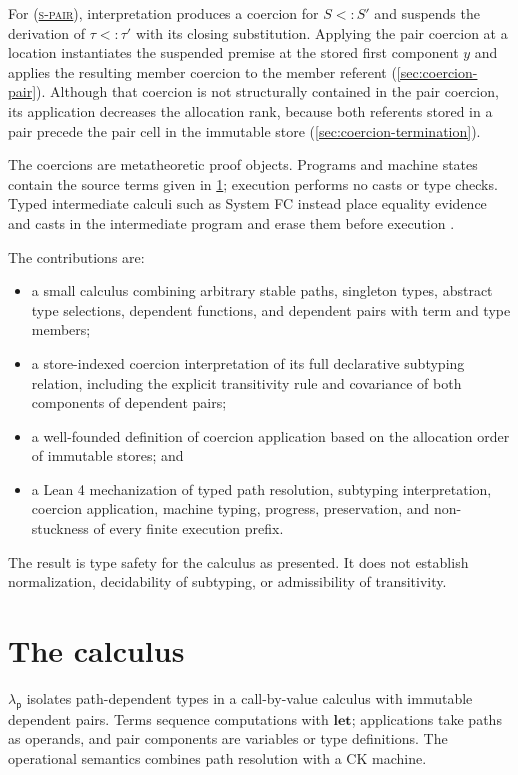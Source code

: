 \documentclass[acmsmall,screen,nonacm]{acmart}
\newcommand{\ruleref}[1]{%
  \textsc{(\hyperref[rule:#1]{#1})}}
\newcommand{\lambdap}{\ensuremath{\lambda_{\mathsf p}}}
\begin{document}
For \ruleref{s-pair}, interpretation produces a coercion for \(S<:S'\) and
suspends the derivation of \(\tau<:\tau'\) with its closing substitution.
Applying the pair coercion at a location instantiates the suspended premise
at the stored first component \(y\) and applies the resulting member coercion
to the member referent (\cref{sec:coercion-pair}). Although that coercion is
not structurally contained in the pair coercion, its application decreases
the allocation rank, because both referents stored in a pair precede the
pair cell in the immutable store (\cref{sec:coercion-termination}).

The coercions are metatheoretic proof objects. Programs and
machine states contain the source terms given in \cref{sec:calculus};
execution performs no casts or type checks. Typed intermediate calculi such
as System FC instead place equality evidence and casts in the intermediate
program and erase them before execution \citep{sulzmann2007systemfc}.

The contributions are:
\begin{itemize}
\item a small calculus combining arbitrary stable paths, singleton types,
  abstract type selections, dependent functions, and dependent pairs with
  term and type members;
\item a store-indexed coercion interpretation of its full declarative
  subtyping relation, including the explicit transitivity rule and covariance
  of both components of dependent pairs;
\item a well-founded definition of coercion application based on the allocation order
  of immutable stores; and
\item a Lean 4 mechanization of typed path resolution, subtyping
  interpretation, coercion application, machine typing, progress,
  preservation, and
  non-stuckness of every finite execution prefix.
\end{itemize}

The result is type safety for the calculus as presented. It does not establish
normalization, decidability of subtyping, or admissibility of transitivity.

\section{The calculus}
\label{sec:calculus}

\lambdap{} isolates path-dependent types in a call-by-value calculus with
immutable dependent pairs. Terms sequence computations with
\(\mathbf{let}\); applications take paths as operands, and pair components
are variables or type definitions. The operational semantics combines path
resolution with a CK machine.
\end{document}
